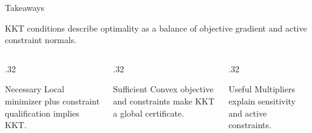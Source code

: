 \documentclass[aspectratio=169]{beamer}
\begin{document}
\begin{frame}{Takeaways}
  \begin{center}
  \Large
  KKT conditions describe optimality as a balance of objective gradient and active constraint normals.
  \end{center}
  \vspace{.7em}
  \begin{columns}[T,totalwidth=\textwidth]
  \begin{column}{.32\textwidth}
    \begin{block}{Necessary}
      Local minimizer plus constraint qualification implies KKT.
    \end{block}
  \end{column}
  \begin{column}{.32\textwidth}
    \begin{block}{Sufficient}
      Convex objective and constraints make KKT a global certificate.
    \end{block}
  \end{column}
  \begin{column}{.32\textwidth}
    \begin{block}{Useful}
      Multipliers explain sensitivity and active constraints.
    \end{block}
  \end{column}
  \end{columns}
\end{frame}
\end{document}
